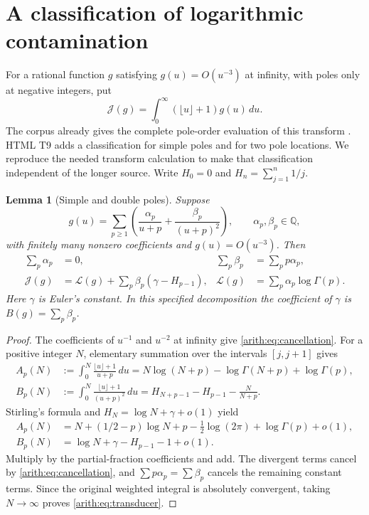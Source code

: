 \documentclass[11pt,a4paper]{article}
\newtheorem{lemma}[theorem]{Lemma}
\theoremstyle{definition}\newtheorem{definition}[theorem]{Definition}
\theoremstyle{remark}\newtheorem{remark}[theorem]{Remark}
\begin{document}
\section{A classification of logarithmic contamination}
\label{arith:sec:poles}

For a rational function $g$ satisfying $g(u)=O(u^{-3})$ at infinity,
with poles only at negative integers, put
\[
 \mathcal J(g)=\int_0^{\infty}(\lfloor u\rfloor+1)g(u)\,du.
\]
The corpus already gives the complete pole-order evaluation of this
transform \cite{Corpus001}.  HTML T9 adds a classification for simple
poles and for two pole locations.  We reproduce the needed transform
calculation to make that classification independent of the longer source.
Write $H_0=0$ and $H_n=\sum_{j=1}^n1/j$.

\begin{lemma}[Simple and double poles]\label{arith:lem:transform}
Suppose
\[
 g(u)=\sum_{p\ge1}\left(\frac{\alpha_p}{u+p}
                         +\frac{\beta_p}{(u+p)^2}\right),
 \qquad \alpha_p,\beta_p\in\mathbb Q,
\]
with finitely many nonzero coefficients and $g(u)=O(u^{-3})$.
Then
\begin{align}
 \sum_p\alpha_p&=0,&\sum_p\beta_p&=\sum_p p\alpha_p,
       \label{arith:eq:cancellation}\\
 \mathcal J(g)&=\mathcal L(g)+
                   \sum_p\beta_p(\gamma-H_{p-1}),&
 \mathcal L(g)&=\sum_p\alpha_p\log\Gamma(p).
       \label{arith:eq:transducer}
\end{align}
Here $\gamma$ is Euler's constant.  In this specified decomposition the
coefficient of $\gamma$ is $B(g)=\sum_p\beta_p$.
\end{lemma}
\begin{proof}
The coefficients of $u^{-1}$ and $u^{-2}$ at infinity give
\eqref{arith:eq:cancellation}.  For a positive integer $N$, elementary
summation over the intervals $[j,j+1]$ gives
\begin{align*}
 A_p(N)&:=\int_0^N\frac{\lfloor u\rfloor+1}{u+p}\,du
       =N\log(N+p)-\log\Gamma(N+p)+\log\Gamma(p),\\
 B_p(N)&:=\int_0^N\frac{\lfloor u\rfloor+1}{(u+p)^2}\,du
       =H_{N+p-1}-H_{p-1}-\frac{N}{N+p}.
\end{align*}
Stirling's formula and $H_N=\log N+\gamma+o(1)$ yield
\begin{align*}
 A_p(N)&=N+(1/2-p)\log N+p
             -\tfrac12\log(2\pi)+\log\Gamma(p)+o(1),\\
 B_p(N)&=\log N+\gamma-H_{p-1}-1+o(1).
\end{align*}
Multiply by the partial-fraction coefficients and add.
The divergent terms cancel by \eqref{arith:eq:cancellation}, and
$\sum p\alpha_p=\sum\beta_p$ cancels the remaining constant terms.
Since the original weighted integral is absolutely convergent,
taking $N\to\infty$ proves \eqref{arith:eq:transducer}.
\end{proof}
\end{document}
